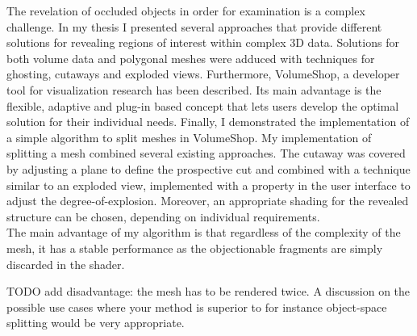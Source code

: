 

The revelation of occluded objects in order for examination is a complex challenge. In my thesis I presented several approaches that provide different solutions for revealing regions of interest within complex 3D data. Solutions for both volume data and polygonal meshes were adduced with techniques for ghosting, cutaways and exploded views. Furthermore, VolumeShop, a developer tool for visualization research has been described. Its main advantage is the flexible, adaptive and plug-in based concept that lets users develop the optimal solution for their individual needs. Finally, I demonstrated the implementation of a simple algorithm to split meshes in VolumeShop. My implementation of splitting a mesh combined several existing approaches. The cutaway was covered by adjusting a plane to define the prospective cut and combined with a technique similar to an exploded view, implemented with a property in the user interface to adjust the degree-of-explosion. Moreover, an appropriate shading for the revealed structure can be chosen, depending on individual requirements.\\
The main advantage of my algorithm is that regardless of the complexity of the mesh, it has a stable performance as the objectionable fragments are simply discarded in the shader.

TODO add disadvantage: the mesh has to be rendered twice. A discussion on the possible use cases where your method is superior to for instance object-space splitting would be very appropriate.